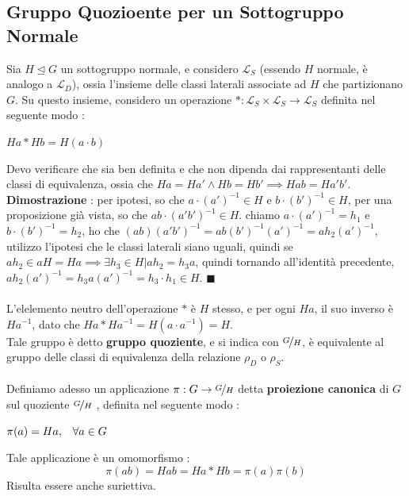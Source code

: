 \documentclass[12pt, letterpaper]{article}
\newcommand{\norm}{{\unlhd}}
\begin{document}
\subsection{Gruppo Quozioente per un Sottogruppo Normale}\label{gqsn}
Sia \(H\norm G\) un sottogruppo normale, e considero \(\mathcal{L}_S\) (essendo \(H\) normale, è analogo a \(\mathcal{L}_D\)),
ossia l'insieme delle classi laterali associate ad \(H\) che partizionano \(G\). Su questo insieme, considero 
un operazione \(* : \mathcal{L}_S\times \mathcal{L}_S\rightarrow \mathcal{L}_S\) 
definita nel seguente modo : \begin{center}
    \(Ha*Hb=H(a\cdot b)\)
\end{center}
Devo verificare che sia ben definita e che non dipenda dai rappresentanti delle classi di equivalenza, ossia 
che \(Ha=Ha'\land Hb=Hb'\implies Hab=Ha'b'\).\\
\textbf{Dimostrazione} : per ipotesi, so che \(a\cdot(a')^{-1}\in H\) e  \(b\cdot(b')^{-1}\in H\), per una 
proposizione già vista, so che \(ab\cdot (a'b')^{-1}\in H\). chiamo \(a\cdot(a')^{-1}=h_1\) e 
\(b\cdot(b')^{-1}=h_2\), ho che  \((ab)(a'b')^{-1}=ab(b')^{-1}(a')^{-1}=ah_2(a')^{-1}\), utilizzo l'ipotesi 
che le classi laterali siano uguali, quindi se   \(ah_2\in aH=Ha\implies\exists h_3\in H|ah_2=h_3a\), quindi 
tornando all'identità precedente,    \(ah_2(a')^{-1}=h_3a(a')^{-1}=h_3\cdot h_1\in H\). \(\blacksquare\)\\\hphantom{}\\
L'elelemento neutro dell'operazione \(*\) è \(H\) stesso, e per ogni \(Ha\), il suo inverso è 
\(Ha^{-1}\), dato che \(Ha*Ha^{-1}=H(a\cdot a^{-1})=H\). \\Tale gruppo è detto \textbf{gruppo quoziente}, 
e si indica con \(\nicefrac{G}{H}\), è equivalente al gruppo delle classi di equivalenza della relazione \(\rho_D\) o \(\rho_S\).
\\\hphantom{}\\
Definiamo adesso un applicazione \(\pi : G\rightarrow \nicefrac{G}{H}\) detta \textbf{proiezione canonica} di
\(G\) sul quoziente \(\nicefrac{G}{H}\) , definita nel seguente modo :\begin{center}
    \(\pi(a)=Ha,\text{\hphantom{a }}\forall a\in G\)
\end{center}
Tale applicazione è un omomorfismo : \begin{equation}
    \pi(ab)=Hab=Ha*Hb=\pi(a)\pi(b)
\end{equation}
Risulta essere anche suriettiva. 
\end{document}
